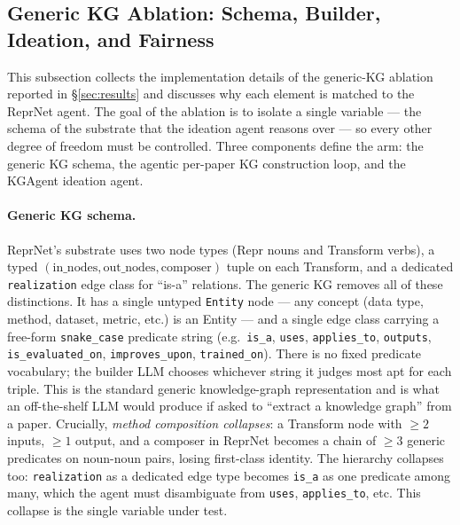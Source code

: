 \documentclass[10pt,twocolumn]{article}
\begin{document}
\subsection{Generic KG Ablation: Schema, Builder, Ideation, and Fairness}
\label{app:kg-ablation-impl}

This subsection collects the implementation details of the
generic-KG ablation reported in \S\ref{sec:results} and discusses
why each element is matched to the ReprNet agent.  The goal of
the ablation is to isolate a single variable --- the schema of the
substrate that the ideation agent reasons over --- so every other
degree of freedom must be controlled.  Three components define the
arm: the generic KG schema, the agentic per-paper KG construction
loop, and the KGAgent ideation agent.

\paragraph{Generic KG schema.}  ReprNet's substrate uses two node
types (Repr nouns and Transform verbs), a typed
$(\text{in\_nodes}, \text{out\_nodes}, \text{composer})$ tuple on
each Transform, and a dedicated \texttt{realization} edge class for
``is-a'' relations.  The generic KG removes all of these
distinctions.  It has a single untyped \texttt{Entity} node ---
any concept (data type, method, dataset, metric, etc.) is an
Entity --- and a single edge class carrying a free-form
\texttt{snake\_case} predicate string (e.g.\ \texttt{is\_a},
\texttt{uses}, \texttt{applies\_to}, \texttt{outputs},
\texttt{is\_evaluated\_on}, \texttt{improves\_upon},
\texttt{trained\_on}).  There is no fixed predicate vocabulary;
the builder LLM chooses whichever string it judges most apt for
each triple.  This is the standard generic knowledge-graph
representation and is what an off-the-shelf LLM would produce if
asked to ``extract a knowledge graph'' from a paper.  Crucially,
\emph{method composition collapses}: a Transform node with
$\geq 2$ inputs, $\geq 1$ output, and a composer in ReprNet
becomes a chain of $\geq 3$ generic predicates on noun-noun
pairs, losing first-class identity.  The hierarchy collapses too:
\texttt{realization} as a dedicated edge type becomes
\texttt{is\_a} as one predicate among many, which the agent must
disambiguate from \texttt{uses}, \texttt{applies\_to}, etc.
This collapse is the single variable under test.
\end{document}
